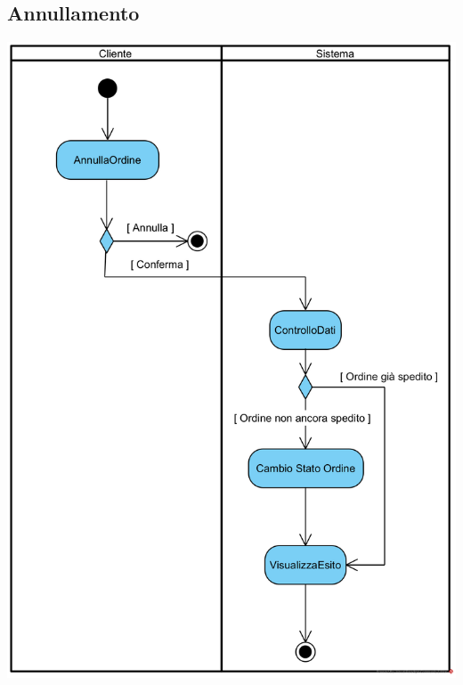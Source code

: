 \documentclass[12pt]{article}
\begin{document}
\subsection{Annullamento}
\begin{center}
\includegraphics[width=\textwidth]{ActivityDiagram/ClienteAnnullamentoOrdine}
\end{center}
\end{document}
